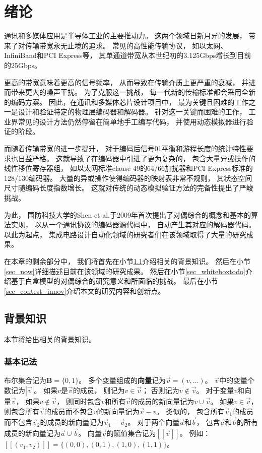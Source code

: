 \chapter{绪论}
\label{chap:1}

通讯和多媒体应用是半导体工业的主要推动力。
这两个领域日新月异的发展，
带来了对传输带宽永无止境的追求。
常见的高性能传输协议，
如以太网、InfiniBand和PCI Express等，
其单通道带宽从本世纪初的3.125Gbps增长到目前的25Gbps。

更高的带宽意味着更高的信号频率，
从而导致在传输介质上更严重的衰减，
并进而带来更大的噪声干扰。
为了克服这一挑战，
每一代新的传输标准都会采用全新的编码方案。
因此，在通讯和多媒体芯片设计项目中，
最为关键且困难的工作之一是设计和验证特定的物理层编码器和解码器。
针对这一关键而困难的工作，
工业界常见的设计方法仍然停留在简单地手工编写代码，
并使用动态模拟器进行验证的阶段。

而随着传输带宽的进一步提升，
对于编码后信号01平衡和游程长度的统计特性要求也日益严格。
这就导致了在编码器中引进了更为复杂的，
包含大量异或操作的线性移位寄存器组，
如以太网标准clause 49的64/66加扰器和PCI Express标准的128/130编码器。
大量的异或操作使得编码器的映射表非常不规则，
其状态空间尺寸随编码长度指数增长。
这就对传统的动态模拟验证方法的完备性提出了严峻挑战。

为此，
国防科技大学的Shen et al.于2009年首次提出了对偶综合的概念和基本的算法实现，
以从一个通讯协议的编码器源代码中，
自动产生其对应的解码器代码。
以此为起点，
集成电路设计自动化领域的研究者们在该领域取得了大量的研究成果。

在本章的剩余部分中，
我们将首先在小节\ref{sec_back}介绍相关的背景知识。
然后在小节\ref{sec_now}详细描述目前在该领域的研究成果。
然后在小节\ref{sec_whiteboxtodo}介绍基于白盒模型的对偶综合的研究意义和所面临的挑战。
最后在小节\ref{sec_contest_innov}介绍本文的研究内容和创新点。



\section{背景知识}\label{sec_back}
本节将给出相关的背景知识。

\subsection{基本记法}
布尔集合记为$\mathbf{B}=\{0,1\}$。
多个变量组成的\textbf{向量}记为$\vec{v}=(v,\dots)$。
$\vec{v}$中的变量个数记为$|\vec{v}|$。
如果$v$是$\vec{v}$的成员，
则记为$v\in\vec{v}$；
否则记为$v\notin\vec{v}$。
对于变量$v$和向量$\vec{v}$，
如果$v\notin\vec{v}$，
则同时包含$v$和所有$\vec{v}$的成员的新向量记为$v\cup\vec{v}$。
如果$v\in \vec{v}$，
则包含所有$\vec{v}$的成员而不包含$v$的新向量记为$\vec{v}-v$。
类似的，
包含所有$\vec{v}_1$的成员而不包含$\vec{v}_2$的成员的新向量记为$\vec{v}_1-\vec{v}_2$。
对于两个向量$\vec{a}$和$\vec{b}$，
包含$\vec{a}$和$\vec{b}$的所有成员的新向量记为$\vec{a}\cup\vec{b}$。
向量$\vec{v}$的赋值集合记为$[\![\vec{v}]\!]$。
例如：
$[\![(v_1,v_2)]\!]=\{(0,0),(0,1),(1,0),(1,1)\}$。

